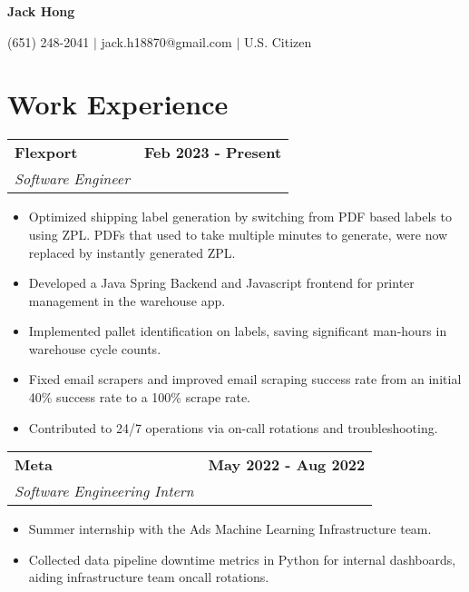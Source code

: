 \documentclass[11pt]{extreport}
\makeatletter
\newcommand{\resumeSubheading}[4]{
  \vspace{-1pt}
    \begin{tabular*}{1.0\textwidth}{l@{\extracolsep{\fill}}r}
      \textbf{#1} & \textbf{#2}  \vspace{1mm} \\
      {#3} & \textbf{#4} \\
    \end{tabular*}\vspace{-3pt}
}
\makeatother
\begin{document}
\vspace*{-40pt}
\begin{center}
	\textbf{{\LARGE Jack Hong}} \\
	      \vspace{2mm}

    (651) 248-2041 $|$ jack.h18870@gmail.com $|$ U.S. Citizen
\end{center}
\vspace{-4mm}

\section{Work Experience}
\resumeSubheading{Flexport}{Feb 2023 - Present}
    {\textit{Software Engineer}}{}
    \vspace{-3mm}
    \begin{itemize}
    \item[\textperiodcentered] Optimized shipping label generation by switching from PDF based labels to using ZPL. PDFs that used to take multiple minutes to generate, were now replaced by instantly generated ZPL.
    \item[\textperiodcentered] Developed a Java Spring Backend and Javascript frontend for printer management in the warehouse app.
    \item[\textperiodcentered] Implemented pallet identification on labels, saving significant man-hours in warehouse cycle counts. 
        \item[\textperiodcentered] Fixed email scrapers and improved email scraping success rate from an initial 40\% success rate to a 100\% scrape rate.
    \item[\textperiodcentered] Contributed to 24/7 operations via on-call rotations and troubleshooting.

      \vspace{-1mm}
    \end{itemize}

\resumeSubheading{Meta}{May 2022 - Aug 2022}
    {\textit{Software Engineering Intern}}{}
    \vspace{-3mm}
    \begin{itemize}
    \item[\textperiodcentered] Summer internship with the Ads Machine Learning Infrastructure team.
    \vspace{-1mm}
     \item[\textperiodcentered] Collected data pipeline downtime metrics in Python for internal dashboards, aiding infrastructure team oncall rotations.
      \vspace{-1mm}
    \end{itemize}
    
\end{document}
